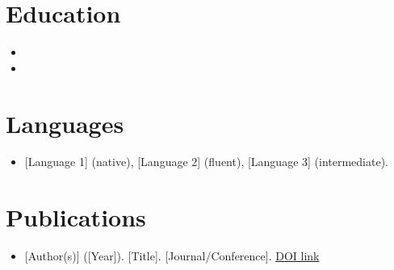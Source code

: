 \documentclass[11pt,a4paper,sans]{moderncv}
\begin{document}
\section{Education}
\vspace{1pt}
\begin{itemize}

\item{}

\vspace{3pt}

\item{}

\end{itemize}


\section{Languages}
\vspace{1pt}
\begin{itemize}
\item {[Language 1] (native), [Language 2] (fluent), [Language 3] (intermediate).}
\end{itemize}


\section{Publications}
\vspace{1pt}
\begin{itemize}
\item {[Author(s)] ([Year]). [Title]. [Journal/Conference]. \href{[DOI_URL]}{DOI link}}
\end{itemize}

\end{document}
